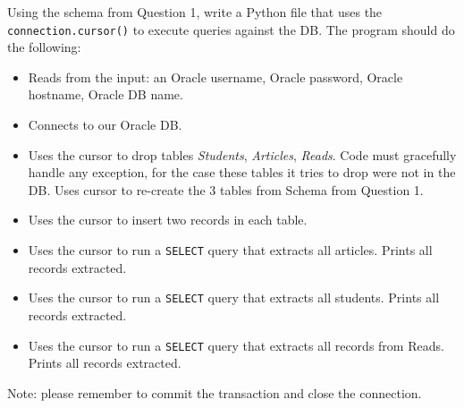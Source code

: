 \documentclass[letterpaper, 11pt]{article}
\begin{document}
Using the schema from Question 1, write a Python file that uses the \texttt{connection.cursor()} to execute queries against the DB. The program should do the following:
\begin{itemize}[label=-]
    \item Reads from the input: an Oracle username, Oracle password, Oracle hostname, Oracle DB name.
    \item Connects to our Oracle DB.
    \item Uses the cursor to drop tables \textit{Students}, \textit{Articles}, \textit{Reads}. Code must gracefully handle any exception, for the case these tables it tries to drop were not in the DB. Uses cursor to re-create the 3 tables from Schema from Question 1.
    \item Uses the cursor to insert two records in each table.
    \item Uses the cursor to run a \texttt{SELECT} query that extracts all articles. Prints all records extracted.
    \item Uses the cursor to run a \texttt{SELECT} query that extracts all students. Prints all records extracted.
    \item Uses the cursor to run a \texttt{SELECT} query that extracts all records from Reads. Prints all records extracted.
\end{itemize}

Note: please remember to commit the transaction and close the connection.
\end{document}
